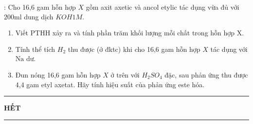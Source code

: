 \begin{bt}[$2{,}5$ điểm]
	: Cho 16,6 gam hỗn hợp $X$ gồm axit axetic và ancol etylic tác dụng vừa đủ với $200\mathrm{ml}$ dung dịch $KOH 1M$.
	\begin{enumerate}
		\item Viết PTHH xảy ra và tính phần trăm khối lượng mỗi chất trong hỗn hợp X.
		\item Tính thể tích $H_2$ thu được (ở đktc) khi cho 16,6 gam hỗn hợp $X$ tác dụng với $\mathrm{Na}$ dư.
		\item Đun nóng 16,6 gam hỗn hợp $X$ ở trên với $H_2SO_4$ đặc, sau phản ứng thu được 4,4 gam etyl axetat. Hãy tính hiệu suất của phản ứng este hóa.
	\end{enumerate}
	\loigiai{}
\end{bt}


\fileend

\begin{center}
	\rule[4pt]{2cm}{1pt}\large \textbf{HẾT}\rule[4pt]{2cm}{1pt}
\end{center}